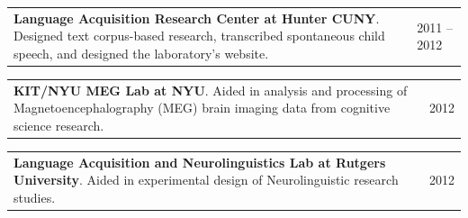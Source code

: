 \documentclass{resume} %
\begin{document}

\begin{tabular}{@{}p{}p{}@{}}
  {\bf Language Acquisition Research Center at Hunter CUNY}.
  Designed text corpus-based research, transcribed spontaneous child speech, and designed the laboratory's website.
  &
\hfill  {2011 --2012}
\end{tabular}

\begin{tabular}{@{}p{}p{}@{}}
  {\bf KIT/NYU MEG Lab at NYU}.
  Aided in analysis and processing of Magnetoencephalography (MEG) brain imaging data from cognitive science research.
  &
\hfill {2012}
\end{tabular}


\begin{tabular}{@{}p{}p{}@{}}
  {\bf Language Acquisition and Neurolinguistics Lab at Rutgers University}.
  Aided in experimental design of Neurolinguistic research studies.
  &
\hfill {2012}
\end{tabular}





\end{document}
